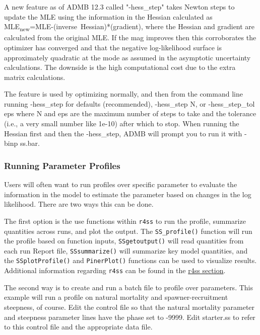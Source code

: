A new feature as of ADMB 12.3 called "-hess\_step" takes Newton steps to update the MLE using the information in the Hessian calculated as MLE\textsubscript{new}=MLE-(inverse~Hessian)*(gradient), where the Hessian and gradient are calculated from the original MLE. If the mag improves then this corroborates the optimizer has converged and that the negative log-likelihood surface is approximately quadratic at the mode as assumed in the asymptotic uncertainty calculations. The downside is the high computational cost due to the extra matrix calculations.

The feature is used by optimizing normally, and then from the command line running -hess\_step for defaults (recommended), -hess\_step N, or -hess\_step\_tol eps where N and eps are the maximum number of steps to take and the tolerance (i.e., a very small number like 1e-10) after which to stop. When running the Hessian first and then the -hess\_step, ADMB will prompt you to run it with -binp ss.bar.


\subsubsection{Running Parameter Profiles}
Users will often want to run profiles over specific parameter to evaluate the information in the model to estimate the parameter based on changes in the log likelihood.  There are two ways this can be done.

The first option is the use functions within \texttt{r4ss} to run the profile, summarize quantities across runs, and plot the output.  The \texttt{SS\_profile()} function will run the profile based on function inputs, \texttt{SSgetoutput()} will read quantities from each run Report file, \texttt{SSsummarize()} will summarize key model quantities, and the \texttt{SSplotProfile()} and \texttt{PinerPlot()} functions can be used to visualize results.  Additional information regarding \texttt{r4ss} can be found in the \hyperref[sec:r4ss]{r4ss section}. 

The second way is to create and run a batch file to profile over parameters. This example will run a profile on natural mortality and spawner-recruitment steepness, of course.  Edit the control file so that the natural mortality parameter and steepness parameter lines have the phase set to -9999.  Edit starter.ss to refer to this control file and the appropriate data file.

